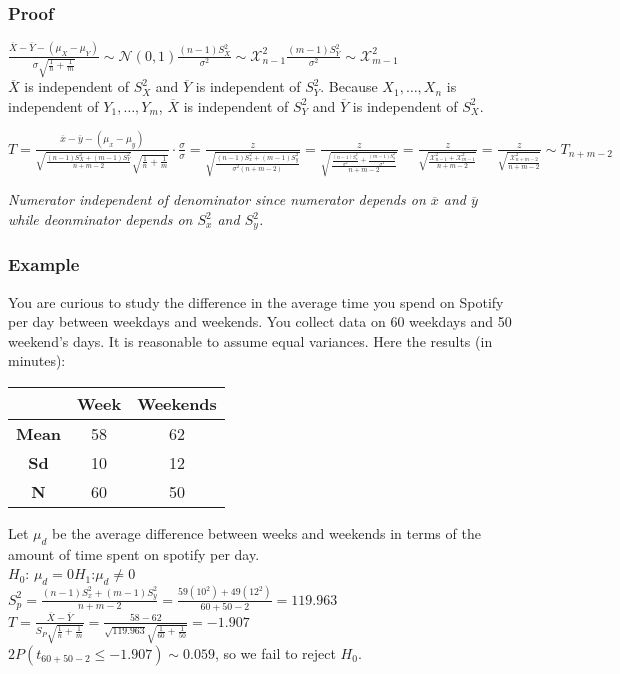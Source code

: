 \documentclass{article}
\begin{document}
\subsubsection{Proof}
$\frac{\overline{X}-\overline{Y}-(\mu_X-\mu_Y)}{\sigma\sqrt{\frac{1}{n}+\frac{1}{m}}}\sim\mathcal{N}(0,1)$\hspace*{0.5in}$\frac{(n-1)S_X^2}{\sigma^2}\sim\mathcal{X}^2_{n-1}$\hspace*{0.5in}$\frac{(m-1)S_Y^2}{\sigma^2}\sim\mathcal{X}^2_{m-1}$\\
$\overline{X}$ is independent of $S_X^2$ and $\overline{Y}$ is independent of $S_Y^2$. Because $X_1,\dots,X_n$ is independent of $Y_1,\dots,Y_m$, $\overline{X}$ is independent of $S_Y^2$ and $\overline{Y}$ is independent of $S_X^2$.
\begin{center}
    $T=\frac{\overline{x}-\overline{y}-(\mu_x-\mu_y)}{\sqrt{\frac{(n-1)S_X^2+(m-1)S_Y^2}{n+m-2}}\sqrt{\frac{1}{n}+\frac{1}{m}}}\cdot\frac{\sigma}{\sigma}=\frac{z}{\sqrt{\frac{(n-1)S_x^2+(m-1)S_y^2}{\sigma^2(n+m-2)}}}=\frac{z}{\sqrt{\frac{\frac{(n-1)S_x^2}{\sigma^2}+\frac{(m-1)S_y^2}{\sigma^2}}{n+m-2}}}=\frac{z}{\sqrt{\frac{\mathcal{X}^2_{n-1}+\mathcal{X}^2_{m-1}}{n+m-2}}}=\frac{z}{\sqrt{\frac{\mathcal{X}^2_{n+m-2}}{n+m-2}}}\sim T_{n+m-2}$\\
\end{center}
\textit{Numerator independent of denominator since numerator depends on $\overline{x}$ and $\overline{y}$ while deonminator depends on $S_x^2$ and $S_y^2$.}
\subsubsection{Example}
You are curious to study the difference in the average time you spend on Spotify per day between weekdays and weekends. You collect data on 60 weekdays and 50 weekend’s days. It is reasonable to assume equal variances. Here the results (in minutes):
\begin{center}
    \begin{tabular}{c|c|c}
         & \textbf{Week} & \textbf{Weekends} \\
         \hline
        \textbf{Mean} & 58 & 62\\
        \hline
        \textbf{Sd} & 10 & 12\\
        \hline
        \textbf{N} & 60 & 50
    \end{tabular}
\end{center}
Let $\mu_d$ be the average difference between weeks and weekends in terms of the amount of time spent on spotify per day.\\
$H_0$: $\mu_d=0$\hspace*{0.5in}$H_1$:$\mu_d\neq 0$\\
$S_p^2=\frac{(n-1)S_x^2+(m-1)S_y^2}{n+m-2}=\frac{59(10^2)+49(12^2)}{60+50-2}=119.963$\\
$T=\frac{\overline{X}-\overline{Y}}{S_P\sqrt{\frac{1}{n}+\frac{1}{m}}}=\frac{58-62}{\sqrt{119.963}\sqrt{\frac{1}{60}+\frac{1}{50}}}=-1.907$\\
$2P(t_{60+50-2}\leq-1.907)\sim0.059$, so we fail to reject $H_0$.
\end{document}
